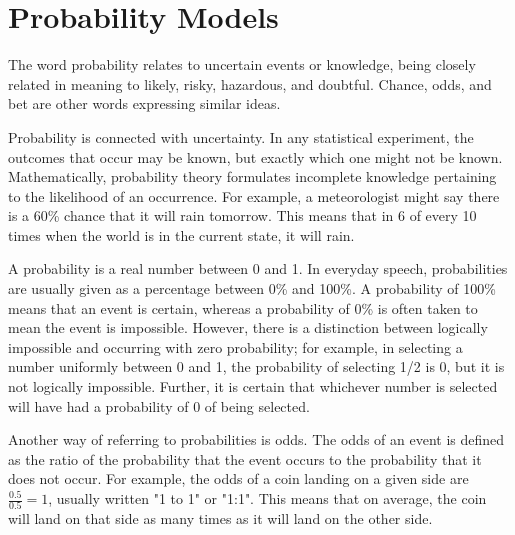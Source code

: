\documentclass[10pt,a4paper,titlepage,twoside,openright]{report}
\begin{document}
\section{Probability Models}
The word probability relates to uncertain events or knowledge, being closely related in meaning to likely, risky, hazardous, and doubtful. Chance, odds, and bet are other words expressing similar ideas.

Probability is connected with uncertainty. In any statistical experiment, the outcomes that occur may be known, but exactly which one might not be known. Mathematically, probability theory formulates incomplete knowledge pertaining to the likelihood of an occurrence. For example, a meteorologist might say there is a 60\% chance that it will rain tomorrow. This means that in 6 of every 10 times when the world is in the current state, it will rain.

A probability is a real number between 0 and 1. In everyday speech, probabilities are usually given as a percentage between 0\% and 100\%. A probability of 100\% means that an event is certain, whereas a probability of 0\% is often taken to mean the event is impossible. However, there is a distinction between logically impossible and occurring with zero probability; for example, in selecting a number uniformly between 0 and 1, the probability of selecting 1/2 is 0, but it is not logically impossible. Further, it is certain that whichever number is selected will have had a probability of 0 of being selected.

Another way of referring to probabilities is odds. The odds of an event is defined as the ratio of the probability that the event occurs to the probability that it does not occur. For example, the odds of a coin landing on a given side are $\frac{0.5}{0.5} = 1$, usually written "1 to 1" or "1:1". This means that on average, the coin will land on that side as many times as it will land on the other side.
\end{document}

